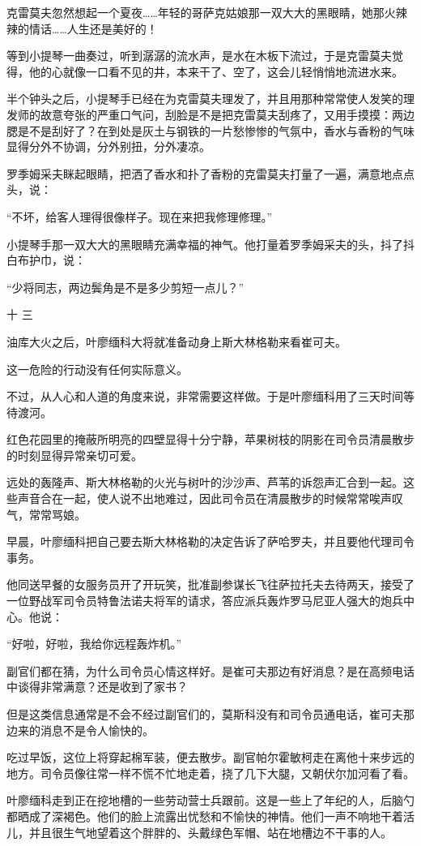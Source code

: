 克雷莫夫忽然想起一个夏夜……年轻的哥萨克姑娘那一双大大的黑眼睛，她那火辣辣的情话……人生还是美好的！

等到小提琴一曲奏过，听到潺潺的流水声，是水在木板下流过，于是克雷莫夫觉得，他的心就像一口看不见的井，本来干了、空了，这会儿轻悄悄地流进水来。

半个钟头之后，小提琴手已经在为克雷莫夫理发了，并且用那种常常使人发笑的理发师的故意夸张的严重口气问，刮脸是不是把克雷莫夫刮疼了，又用手摸摸：两边腮是不是刮好了？在到处是灰土与钢铁的一片愁惨惨的气氛中，香水与香粉的气味显得分外不协调，分外别扭，分外凄凉。

罗季姆采夫眯起眼睛，把洒了香水和扑了香粉的克雷莫夫打量了一遍，满意地点点头，说：

“不坏，给客人理得很像样子。现在来把我修理修理。”

小提琴手那一双大大的黑眼睛充满幸福的神气。他打量着罗季姆采夫的头，抖了抖白布护巾，说：

“少将同志，两边鬓角是不是多少剪短一点儿？”

十 三

油库大火之后，叶廖缅科大将就准备动身上斯大林格勒来看崔可夫。

这一危险的行动没有任何实际意义。

不过，从人心和人道的角度来说，非常需要这样做。于是叶廖缅科用了三天时间等待渡河。

红色花园里的掩蔽所明亮的四壁显得十分宁静，苹果树枝的阴影在司令员清晨散步的时刻显得异常亲切可爱。

远处的轰隆声、斯大林格勒的火光与树叶的沙沙声、芦苇的诉怨声汇合到一起。这些声音合在一起，使人说不出地难过，因此司令员在清晨散步的时候常常唉声叹气，常常骂娘。

早晨，叶廖缅科把自己要去斯大林格勒的决定告诉了萨哈罗夫，并且要他代理司令事务。

他同送早餐的女服务员开了开玩笑，批准副参谋长飞往萨拉托夫去待两天，接受了一位野战军司令员特鲁法诺夫将军的请求，答应派兵轰炸罗马尼亚人强大的炮兵中心。他说：

“好啦，好啦，我给你远程轰炸机。”

副官们都在猜，为什么司令员心情这样好。是崔可夫那边有好消息？是在高频电话中谈得非常满意？还是收到了家书？

但是这类信息通常是不会不经过副官们的，莫斯科没有和司令员通电话，崔可夫那边来的消息不是令人愉快的。

吃过早饭，这位上将穿起棉军装，便去散步。副官帕尔霍敏柯走在离他十来步远的地方。司令员像往常一样不慌不忙地走着，挠了几下大腿，又朝伏尔加河看了看。

叶廖缅科走到正在挖地槽的一些劳动营士兵跟前。这是一些上了年纪的人，后脑勺都晒成了深褐色。他们的脸上流露出忧愁和不愉快的神情。他们一声不响地干着活儿，并且很生气地望着这个胖胖的、头戴绿色军帽、站在地槽边不干事的人。

